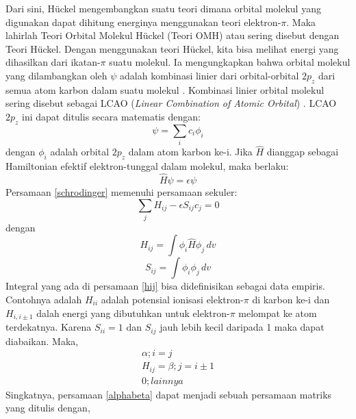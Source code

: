 \documentclass[12pt,a4paper]{report}
\begin{document}
	Dari sini, Hückel mengembangkan suatu teori dimana orbital molekul yang digunakan dapat dihitung energinya menggunakan teori elektron-{$\pi$}. Maka lahirlah Teori Orbital Molekul Hückel (Teori OMH) atau sering disebut dengan Teori Hückel. Dengan menggunakan teori Hückel, kita bisa melihat energi yang dihasilkan dari ikatan-{$\pi$} suatu molekul. Ia mengungkapkan bahwa orbital molekul yang dilambangkan oleh
	{$\psi$} adalah kombinasi linier dari orbital-orbital {$2p_z$} dari semua atom karbon dalam suatu molekul \cite{Rustaman2008}. Kombinasi linier orbital molekul sering disebut sebagai LCAO (\textit{Linear Combination of Atomic Orbital}) \cite{Maczynski1991}. LCAO {$2p_z$} ini dapat ditulis secara matematis dengan:
	\begin{equation}
	\label{lcao}
	{\psi} = \sum\limits_{i} c_i{\phi}_i
	\end{equation}
	dengan {$\phi_i$} adalah orbital {$2p_z$} dalam atom karbon ke-i. Jika $\hat{H}$ dianggap sebagai Hamiltonian efektif elektron-tunggal dalam molekul, maka berlaku:
	\begin{equation}
	\label{schrodinger}
	\hat{H}\psi = \epsilon\psi
	\end{equation}
	Persamaan \eqref{schrodinger} memenuhi persamaan sekuler:
	\begin{equation}
	\sum\limits_{j} {H_{ij}}-{\epsilon}{S_{ij}}c_j=0
	\end{equation}
	dengan
	\begin{equation}
	\label{hij}
	H_{ij} = \int {\phi_i}{\hat{H}}{\phi_j} \,dv
	\end{equation}
	\begin{equation}
	S_{ij} = \int {\phi_i}{\phi_j} \,dv
	\end{equation}
	Integral yang ada di persamaan \eqref{hij} bisa didefinisikan sebagai data empiris. Contohnya adalah {$H_{ii}$} adalah potensial ionisasi elektron-{$\pi$} di karbon ke-i dan {$H_{i,i{\pm}1}$} dalah energi yang dibutuhkan untuk elektron-{$\pi$} melompat ke atom terdekatnya. Karena {$S_{ii}=1$} dan {$S_{ij}$} jauh lebih kecil daripada 1 maka dapat diabaikan. Maka,
	\begin{equation}
	\label{alphabeta}
	\begin{split}
	\alpha ; i = j
	\\
	H_{ij} = \beta ; j = i{\pm}1
	\\
	0 ; lainnya
	\end{split}
	\end{equation}
	Singkatnya, persamaan \eqref{alphabeta} dapat menjadi sebuah persamaan matriks yang ditulis dengan,
\end{document}
